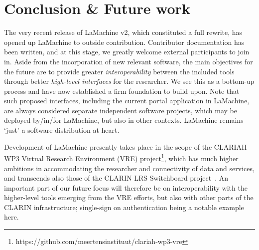 \documentclass[a4paper,11pt]{article}
\begin{document}
\section{Conclusion \& Future work}

The very recent release of LaMachine v2, which constituted a full rewrite, has opened up LaMachine to outside
contribution. Contributor documentation has been written, and at this stage, we greatly welcome external participants
to join in. Aside from the incorporation of new relevant software, the main objectives for the future are to provide
greater \emph{interoperability} between the included tools through better \emph{high-level interfaces} for the
researcher. We see this as a bottom-up process and have now established a firm foundation to build upon. Note that such
proposed interfaces, including the current portal application in LaMachine, are always considered separate independent
software projects, which may be deployed by/in/for LaMachine, but also in other contexts. LaMachine remains `just'
a software distribution at heart.

Development of LaMachine presently takes place in the scope of the CLARIAH WP3 Virtual Research Environment (VRE)
project\footnote{https://github.com/meertensinstituut/clariah-wp3-vre}, which has much higher ambitions in accommodating
the researcher and connectivity of data and services, and transcends also those of the CLARIN LRS Switchboard
project~\cite{switchboard}. An important part of our future focus will therefore be on interoperability with the
higher-level tools emerging from the VRE efforts, but also with other parts of the CLARIN infrastructure; single-sign on
authentication being a notable example here.



\end{document}
